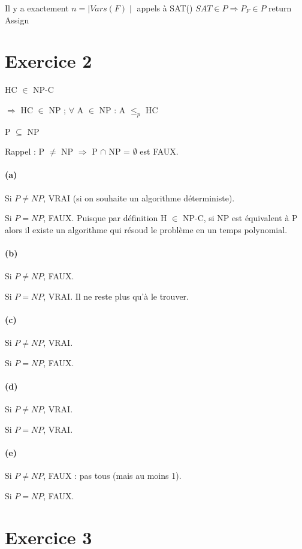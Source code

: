 \documentclass[a4paper, 12pt]{article}
\begin{document}
Il y a exactement $n = \mid Vars(F)\mid$ appels à SAT()
$SAT \in P \Rightarrow P_{F} \in P$ return Assign

\section{Exercice 2}

HC $\in$ NP-C

$\Rightarrow$ HC $\in$ NP ; $\forall$ A $\in$ NP : A $\leq_p$ HC

P $\subseteq$ NP

Rappel : P $\neq$ NP $\Rightarrow$ P $\cap$ NP = $\emptyset$ est FAUX.

\paragraph{(a)}

Si $P \neq NP$, VRAI (si on souhaite un algorithme déterministe).

Si $P = NP$, FAUX. Puisque par définition H $\in$ NP-C, si NP est
équivalent à P alors il existe un algorithme qui résoud le problème en
un temps polynomial.

\paragraph{(b)}
Si $P \neq NP$, FAUX.

Si $P = NP$, VRAI. Il ne reste plus qu'à le trouver.

\paragraph{(c)}
Si $P \neq NP$, VRAI.

Si $P = NP$, FAUX.
\paragraph{(d)}
Si $P \neq NP$, VRAI.

Si $P = NP$, VRAI.
\paragraph{(e)}

Si $P \neq NP$, FAUX : pas tous (mais au moins 1).

Si $P = NP$, FAUX.


\section{Exercice 3}
\end{document}
